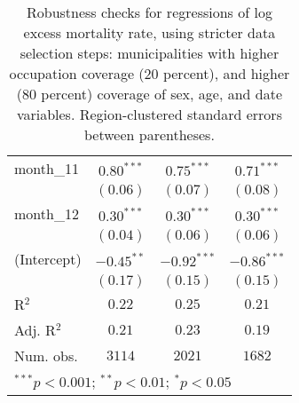 \begin{table}[h!]
\begin{center}
\begin{small}
\begin{tabular}{l c c c}
month\_11      & $0.80^{***}$  & $0.75^{***}$  & $0.71^{***}$  \\
               & $(0.06)$      & $(0.07)$      & $(0.08)$      \\
month\_12      & $0.30^{***}$  & $0.30^{***}$  & $0.30^{***}$  \\
               & $(0.04)$      & $(0.06)$      & $(0.06)$      \\
(Intercept)    & $-0.45^{**}$  & $-0.92^{***}$ & $-0.86^{***}$ \\
               & $(0.17)$      & $(0.15)$      & $(0.15)$      \\
\hline
R$^2$          & $0.22$        & $0.25$        & $0.21$        \\
Adj. R$^2$     & $0.21$        & $0.23$        & $0.19$        \\
Num. obs.      & $3114$        & $2021$        & $1682$        \\
\hline
\multicolumn{4}{l}{\tiny{$^{***}p<0.001$; $^{**}p<0.01$; $^{*}p<0.05$}}
\end{tabular}
\end{small}
\caption{Robustness checks for regressions of log excess mortality rate, using stricter data selection steps: municipalities with higher occupation coverage (20 percent), and higher (80 percent) coverage of sex, age, and date variables. Region-clustered standard errors between parentheses.}
\label{tab:cutoffmodels}
\end{center}
\end{table}

